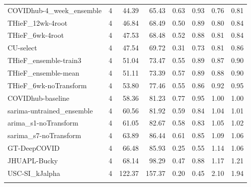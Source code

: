 \documentclass[12pt]{article}
\begin{document}
\begin{longtable}{lrrrrrrr}
  COVIDhub-4\_week\_ensemble & 4 & 44.39 & 65.43 & 0.63 & 0.93 & 0.76 & 0.81 \\ 
  THieF\_12wk-4root & 4 & 46.84 & 68.49 & 0.50 & 0.89 & 0.80 & 0.84 \\ 
  THieF\_6wk-4root & 4 & 47.53 & 68.48 & 0.52 & 0.88 & 0.81 & 0.84 \\ 
  CU-select & 4 & 47.54 & 69.72 & 0.31 & 0.73 & 0.81 & 0.86 \\ 
  THieF\_ensemble-train3 & 4 & 51.04 & 73.47 & 0.55 & 0.89 & 0.87 & 0.90 \\ 
  THieF\_ensemble-mean & 4 & 51.11 & 73.39 & 0.57 & 0.89 & 0.88 & 0.90 \\ 
  THieF\_6wk-noTransform & 4 & 53.80 & 77.46 & 0.55 & 0.86 & 0.92 & 0.95 \\ 
  COVIDhub-baseline & 4 & 58.36 & 81.23 & 0.77 & 0.95 & 1.00 & 1.00 \\ 
  sarima-untrained\_ensemble & 4 & 60.56 & 81.92 & 0.59 & 0.84 & 1.04 & 1.01 \\ 
  arima\_s1-noTransform & 4 & 61.05 & 82.67 & 0.58 & 0.83 & 1.05 & 1.02 \\ 
  sarima\_s7-noTransform & 4 & 63.89 & 86.44 & 0.61 & 0.85 & 1.09 & 1.06 \\ 
  GT-DeepCOVID & 4 & 66.48 & 85.93 & 0.25 & 0.55 & 1.14 & 1.06 \\ 
  JHUAPL-Bucky & 4 & 68.14 & 98.29 & 0.47 & 0.88 & 1.17 & 1.21 \\ 
  USC-SI\_kJalpha & 4 & 122.37 & 157.37 & 0.20 & 0.45 & 2.10 & 1.94 \\ 
   \hline
\hline
\label{tab:table_horizon_states}
\end{longtable}
\endgroup

\newpage
\end{document}
